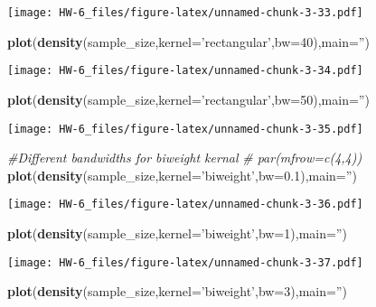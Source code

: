\documentclass[]{article}
\newenvironment{Shaded}{\begin{snugshade}}{\end{snugshade}}
\newcommand{\CommentTok}[1]{\textcolor[rgb]{0.56,0.35,0.01}{\textit{#1}}}
\newcommand{\DataTypeTok}[1]{\textcolor[rgb]{0.13,0.29,0.53}{#1}}
\newcommand{\DecValTok}[1]{\textcolor[rgb]{0.00,0.00,0.81}{#1}}
\newcommand{\FloatTok}[1]{\textcolor[rgb]{0.00,0.00,0.81}{#1}}
\newcommand{\KeywordTok}[1]{\textcolor[rgb]{0.13,0.29,0.53}{\textbf{#1}}}
\newcommand{\NormalTok}[1]{#1}
\newcommand{\StringTok}[1]{\textcolor[rgb]{0.31,0.60,0.02}{#1}}
\begin{document}
\texttt{[image: HW-6\_files/figure-latex/unnamed-chunk-3-33.pdf]}

\begin{Shaded}
\begin{Highlighting}[]
\KeywordTok{plot}\NormalTok{(}\KeywordTok{density}\NormalTok{(sample_size,}\DataTypeTok{kernel=}\StringTok{'rectangular'}\NormalTok{,}\DataTypeTok{bw=}\DecValTok{40}\NormalTok{),}\DataTypeTok{main=}\StringTok{''}\NormalTok{)}
\end{Highlighting}
\end{Shaded}

\texttt{[image: HW-6\_files/figure-latex/unnamed-chunk-3-34.pdf]}

\begin{Shaded}
\begin{Highlighting}[]
\KeywordTok{plot}\NormalTok{(}\KeywordTok{density}\NormalTok{(sample_size,}\DataTypeTok{kernel=}\StringTok{'rectangular'}\NormalTok{,}\DataTypeTok{bw=}\DecValTok{50}\NormalTok{),}\DataTypeTok{main=}\StringTok{''}\NormalTok{)}
\end{Highlighting}
\end{Shaded}

\texttt{[image: HW-6\_files/figure-latex/unnamed-chunk-3-35.pdf]}

\begin{Shaded}
\begin{Highlighting}[]
\CommentTok{#Different bandwidths for biweight kernal}
\CommentTok{# par(mfrow=c(4,4))}
\KeywordTok{plot}\NormalTok{(}\KeywordTok{density}\NormalTok{(sample_size,}\DataTypeTok{kernel=}\StringTok{'biweight'}\NormalTok{,}\DataTypeTok{bw=}\FloatTok{0.1}\NormalTok{),}\DataTypeTok{main=}\StringTok{''}\NormalTok{)}
\end{Highlighting}
\end{Shaded}

\texttt{[image: HW-6\_files/figure-latex/unnamed-chunk-3-36.pdf]}

\begin{Shaded}
\begin{Highlighting}[]
\KeywordTok{plot}\NormalTok{(}\KeywordTok{density}\NormalTok{(sample_size,}\DataTypeTok{kernel=}\StringTok{'biweight'}\NormalTok{,}\DataTypeTok{bw=}\DecValTok{1}\NormalTok{),}\DataTypeTok{main=}\StringTok{''}\NormalTok{)}
\end{Highlighting}
\end{Shaded}

\texttt{[image: HW-6\_files/figure-latex/unnamed-chunk-3-37.pdf]}

\begin{Shaded}
\begin{Highlighting}[]
\KeywordTok{plot}\NormalTok{(}\KeywordTok{density}\NormalTok{(sample_size,}\DataTypeTok{kernel=}\StringTok{'biweight'}\NormalTok{,}\DataTypeTok{bw=}\DecValTok{3}\NormalTok{),}\DataTypeTok{main=}\StringTok{''}\NormalTok{)}
\end{Highlighting}
\end{Shaded}
\end{document}
